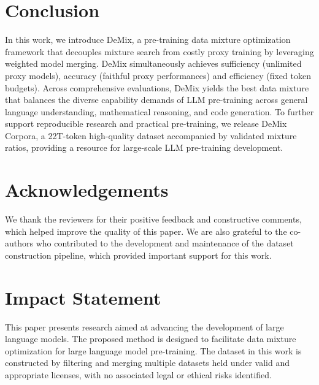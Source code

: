 \documentclass{article}
\theoremstyle{plain}
\theoremstyle{definition}
\theoremstyle{remark}
\begin{document}

\section{Conclusion}
In this work, we introduce DeMix, a pre-training data mixture optimization framework that decouples mixture search from costly proxy training by leveraging weighted model merging. DeMix simultaneously achieves sufficiency
(unlimited proxy models), accuracy (faithful proxy performances)
and efficiency (fixed token budgets). Across comprehensive evaluations, DeMix yields the best data mixture that balances the diverse capability demands of LLM pre-training across general language understanding, mathematical reasoning, and code generation. To further support reproducible research and practical pre-training, we release DeMix Corpora, a 22T-token high-quality dataset accompanied by validated mixture ratios, providing a resource for large-scale LLM pre-training development.

\section*{Acknowledgements}
We thank the reviewers for their positive feedback and constructive comments, which helped improve the quality of this paper.
We are also grateful to the co-authors who contributed to the development and maintenance of the dataset construction pipeline, which provided important support for this work.

\section*{Impact Statement}
This paper presents research aimed at advancing the development of large language models. The proposed method is designed to facilitate data mixture optimization for large language model pre-training. The dataset in this work is constructed by filtering and merging multiple datasets held under valid and appropriate licenses, with no associated legal or ethical risks identified.





\newpage
\appendix
\onecolumn




\end{document}
